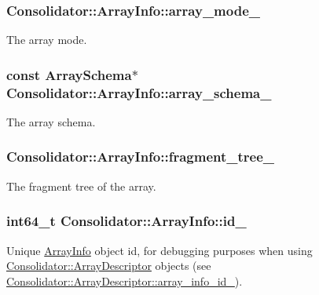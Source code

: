 \subsubsection[{array\+\_\+mode\+\_\+}]{ Consolidator\+::\+Array\+Info\+::array\+\_\+mode\+\_\+}\label{structConsolidator_1_1ArrayInfo_a49b9e65fbf3c2e26984a856e8f713ca0}
The array mode. \hypertarget{structConsolidator_1_1ArrayInfo_a86b809404e3d928ffbfd42758637ef33}{}
\subsubsection[{array\+\_\+schema\+\_\+}]{\setlength{\rightskip}{0pt plus 5cm}const {\bf Array\+Schema}$\ast$ Consolidator\+::\+Array\+Info\+::array\+\_\+schema\+\_\+}\label{structConsolidator_1_1ArrayInfo_a86b809404e3d928ffbfd42758637ef33}
The array schema. \hypertarget{structConsolidator_1_1ArrayInfo_addaf7f6cce37313263f383aaf3fef768}{}
\subsubsection[{fragment\+\_\+tree\+\_\+}]{ Consolidator\+::\+Array\+Info\+::fragment\+\_\+tree\+\_\+}\label{structConsolidator_1_1ArrayInfo_addaf7f6cce37313263f383aaf3fef768}
The fragment tree of the array. \hypertarget{structConsolidator_1_1ArrayInfo_a26f7eef1996807751085758eb6251e2a}{}
\subsubsection[{id\+\_\+}]{\setlength{\rightskip}{0pt plus 5cm}int64\+\_\+t Consolidator\+::\+Array\+Info\+::id\+\_\+}\label{structConsolidator_1_1ArrayInfo_a26f7eef1996807751085758eb6251e2a}
Unique \hyperlink{structConsolidator_1_1ArrayInfo}{Array\+Info} object id, for debugging purposes when using \hyperlink{classConsolidator_1_1ArrayDescriptor}{Consolidator\+::\+Array\+Descriptor} objects (see \hyperlink{classConsolidator_1_1ArrayDescriptor_a6c4666c014b3f10145e678e1a3fb2de0}{Consolidator\+::\+Array\+Descriptor\+::array\+\_\+info\+\_\+id\+\_\+}). \hypertarget{structConsolidator_1_1ArrayInfo_a3b947e8e8b2be5019cc6bf5bc60a1dfd}{}
